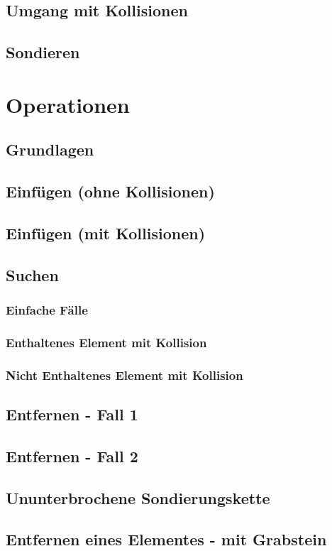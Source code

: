 \subsection{Umgang mit Kollisionen}
\subsection{Sondieren}

\section{Operationen}
\subsection{Grundlagen}
\subsection{Einfügen (ohne Kollisionen)}
\subsection{Einfügen (mit Kollisionen)}
\subsection{Suchen}
\subsubsection{Einfache Fälle}
\subsubsection{Enthaltenes Element mit Kollision}
\subsubsection{Nicht Enthaltenes Element mit Kollision}
\subsection{Entfernen - Fall 1}
\subsection{Entfernen - Fall 2}
\subsection{Ununterbrochene Sondierungskette}
\subsection{Entfernen eines Elementes - mit Grabstein}
